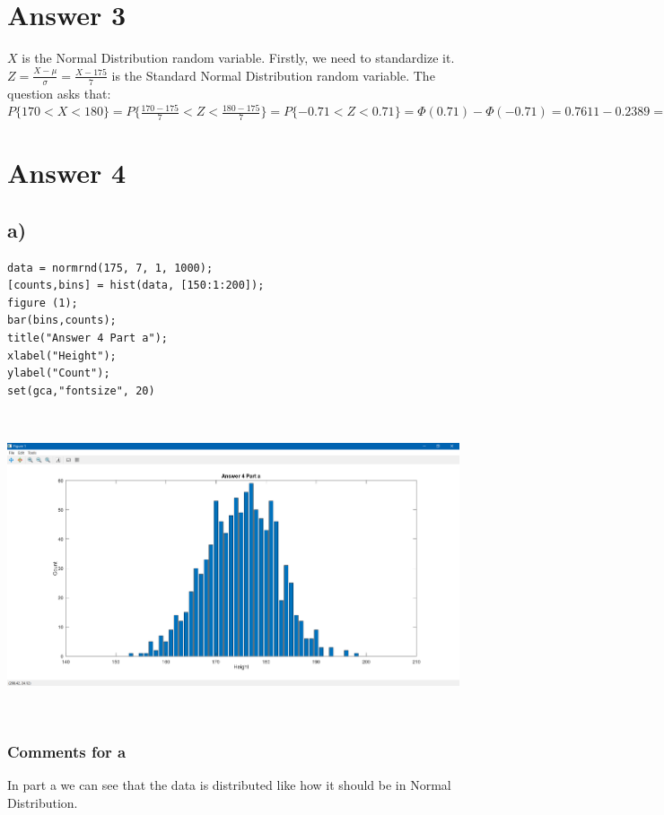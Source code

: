 \documentclass[12pt]{article}
\begin{document}
\section*{Answer 3}
$X$ is the Normal Distribution random variable. Firstly, we need to standardize it.\vspace{0.3cm}\\ $Z = \frac{X-\mu}{\sigma} = \frac{X-175}{7}$ is the Standard Normal Distribution random variable. The question asks that:\vspace{0.3cm}\\
$ P\{170 < X < 180\} = P\{\frac{170-175}{7} < Z < \frac{180-175}{7}\} = P\{-0.71 < Z < 0.71\} = \Phi(0.71) - \Phi(-0.71) = 0.7611 - 0.2389 = 0.5222. $

\section*{Answer 4}

\subsection*{a)} 
\begin{Verbatim}[tabsize=4]
data = normrnd(175, 7, 1, 1000);
[counts,bins] = hist(data, [150:1:200]);
figure (1);
bar(bins,counts);
title("Answer 4 Part a");
xlabel("Height");
ylabel("Count");
set(gca,"fontsize", 20)
\end{Verbatim}

\includegraphics[width=16cm, height=9cm]{a.png} 

\subsubsection*{Comments for a}
In part a we can see that the data is distributed like how it should be in Normal Distribution.
\vspace{0.3cm}\\
\end{document}
